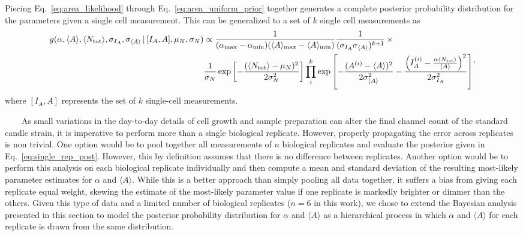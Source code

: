 Piecing
Eq.~\ref{eq:area_likelihood}
through
Eq.~\ref{eq:area_uniform_prior}
together
generates
a
complete
posterior
probability
distribution
for
the
parameters
given
a
single
cell
measurement.
This
can be
generalized
to a
set of
\(k\)
single
cell
measurements
as
\begin{equation}
\begin{aligned}
g(\alpha,\langle A \rangle, \langle N_\text{tot} \rangle, \sigma_{I_A}, \sigma_{\langle A \rangle}\,\vert\, [I_A, A], \mu_N, \sigma_N) &\propto {1 \over (\alpha_\text{max} - \alpha_\text{min})(\langle A \rangle_\text{max} - \langle A \rangle_\text{min})}{1 \over (\sigma_{I_A}\sigma_{\langle A \rangle})^{k+1}}\,\times\\
&{1 \over \sigma_N}\exp\left[- {(\langle N_\text{tot}\rangle - \mu_N)^2 \over 2\sigma_N^2}\right]
\prod\limits_i^k\exp\left[-{(A^{(i)} - \langle A \rangle)^2 \over 2\sigma_{\langle A \rangle}^2} - {\left(I_A^{(i)} - {\alpha \langle N_\text{tot}\rangle \over \langle A \rangle}\right)^2 \over 2\sigma_{I_A}^2}\right] \end{aligned},
\label{eq:single_rep_post}\end{equation}
where
\([I_A, A]\)
represents
the
set of
\(k\)
single-cell
measurements.

~~~~As
small
variations
in the
day-to-day
details
of
cell
growth
and
sample
preparation
can
alter
the
final
channel
count
of the
standard
candle
strain,
it is
imperative
to
perform
more
than a
single
biological
replicate.
However,
properly
propagating
the
error
across
replicates
is non
trivial.
One
option
would
be to
pool
together
all
measurements
of
\(n\)
biological
replicates
and
evaluate
the
posterior
given
in
Eq.~\ref{eq:single_rep_post}.
However,
this
by
definition
assumes
that
there
is no
difference
between
replicates.
Another
option
would
be to
perform
this
analysis
on
each
biological
replicate
individually
and
then
compute
a mean
and
standard
deviation
of the
resulting
most-likely
parameter
estimates
for
\(\alpha\)
and
\(\langle A \rangle\).
While
this
is a
better
approach
than
simply
pooling
all
data
together,
it
suffers
a bias
from
giving
each
replicate
equal
weight,
skewing
the
estimate
of the
most-likely
parameter
value
if one
replicate
is
markedly
brighter
or
dimmer
than
the
others.
Given
this
type
of
data
and a
limited
number
of
biological
replicates
(\(n = 6\)
in
this
work),
we
chose
to
extend
the
Bayesian
analysis
presented
in
this
section
to
model
the
posterior
probability
distribution
for
\(\alpha\)
and
\(\langle A \rangle\)
as a
hierarchical
process
in
which
\(\alpha\)
and
\(\langle A \rangle\)
for
each
replicate
is
drawn
from
the
same
distribution.

